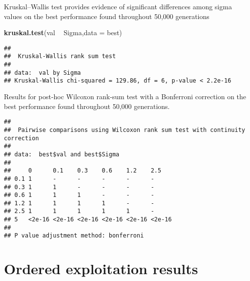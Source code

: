 \documentclass[]{book}
\newenvironment{Shaded}{\begin{snugshade}}{\end{snugshade}}
\newcommand{\DataTypeTok}[1]{\textcolor[rgb]{0.13,0.29,0.53}{#1}}
\newcommand{\KeywordTok}[1]{\textcolor[rgb]{0.13,0.29,0.53}{\textbf{#1}}}
\newcommand{\NormalTok}[1]{#1}
\newcommand{\OperatorTok}[1]{\textcolor[rgb]{0.81,0.36,0.00}{\textbf{#1}}}
\newcommand{\OtherTok}[1]{\textcolor[rgb]{0.56,0.35,0.01}{#1}}
\newcommand{\StringTok}[1]{\textcolor[rgb]{0.31,0.60,0.02}{#1}}
\begin{document}
Kruskal--Wallis test provides evidence of significant differences among sigma values on the best performance found throughout 50,000 generations

\begin{Shaded}
\begin{Highlighting}[]
\KeywordTok{kruskal.test}\NormalTok{(val }\OperatorTok{~}\StringTok{ }\NormalTok{Sigma,}\DataTypeTok{data =}\NormalTok{ best)}
\end{Highlighting}
\end{Shaded}

\begin{verbatim}
## 
##  Kruskal-Wallis rank sum test
## 
## data:  val by Sigma
## Kruskal-Wallis chi-squared = 129.86, df = 6, p-value < 2.2e-16
\end{verbatim}

Results for post-hoc Wilcoxon rank-sum test with a Bonferroni correction on the best performance found throughout 50,000 generations.

\begin{Shaded}
\end{Shaded}

\begin{verbatim}
## 
##  Pairwise comparisons using Wilcoxon rank sum test with continuity correction 
## 
## data:  best$val and best$Sigma 
## 
##     0      0.1    0.3    0.6    1.2    2.5   
## 0.1 1      -      -      -      -      -     
## 0.3 1      1      -      -      -      -     
## 0.6 1      1      1      -      -      -     
## 1.2 1      1      1      1      -      -     
## 2.5 1      1      1      1      1      -     
## 5   <2e-16 <2e-16 <2e-16 <2e-16 <2e-16 <2e-16
## 
## P value adjustment method: bonferroni
\end{verbatim}

\hypertarget{ordered-exploitation-results-5}{%
\section{Ordered exploitation results}\label{ordered-exploitation-results-5}}
\end{document}
